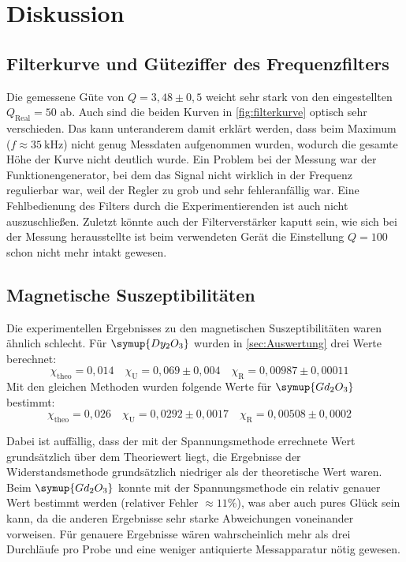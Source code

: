 \section{Diskussion}
\label{sec:Diskussion}

\subsection{Filterkurve und Güteziffer des Frequenzfilters}
\label{sec:Filterkurve und Güteziffer des Frequenzfilters}

Die gemessene Güte von $Q = 3,48 \pm 0,5$ weicht sehr stark von den eingestellten 
$Q_\text{Real} = 50$ ab. Auch sind die beiden Kurven in \autoref{fig:filterkurve} optisch
sehr verschieden. Das kann unteranderem damit erklärt werden, dass beim Maximum ($f
\approx \SI{35}{\kilo\hertz}$) nicht genug Messdaten aufgenommen wurden, wodurch die
gesamte Höhe der Kurve nicht deutlich wurde. Ein Problem bei der Messung war der
Funktionengenerator, bei dem das Signal nicht wirklich in der Frequenz regulierbar war,
weil der Regler zu grob und sehr fehleranfällig war. Eine Fehlbedienung des Filters durch die
Experimentierenden ist auch nicht auszuschließen. Zuletzt könnte auch der Filterverstärker
kaputt sein, wie sich bei der Messung herausstellte ist beim verwendeten Gerät die Einstellung 
$Q = 100$ schon nicht mehr intakt gewesen.

\subsection{Magnetische Suszeptibilitäten}
\label{sec:Magnetische Suszeptibilitäten}

Die experimentellen Ergebnisses zu den magnetischen Suszeptibilitäten waren ähnlich
schlecht. Für $\symup{Dy_2O_3}$ wurden in \autoref{sec:Auswertung} drei Werte berechnet:
\begin{equation}
	\label{eqn:ergebnisse-Dy2O3}
	\chi_\text{theo} = 0,014
	\quad
	\chi_\text{U} = 0,069 \pm 0,004
	\quad
	\chi_\text{R} = 0,00987 \pm 0,00011
	\quad
\end{equation}
Mit den gleichen Methoden wurden folgende Werte für $\symup{Gd_2O_3}$ bestimmt:
\begin{equation}
	\label{eqn:ergebnisse-Gd2O3}
	\chi_\text{theo} = 0,026
	\quad
	\chi_\text{U} = 0,0292 \pm 0,0017
	\quad
	\chi_\text{R} = 0,00508 \pm 0,0002
	\quad
\end{equation}

Dabei ist auffällig, dass der mit der Spannungsmethode errechnete Wert grundsätzlich 
über dem Theoriewert liegt, die Ergebnisse der Widerstandsmethode grundsätzlich niedriger
als der theoretische Wert waren. Beim $\symup{Gd_2O_3}$ konnte mit der Spannungsmethode
ein relativ genauer Wert bestimmt werden (relativer Fehler $\approx 11\%$),
was aber auch pures Glück sein kann, da die anderen Ergebnisse sehr starke
Abweichungen voneinander vorweisen. Für genauere Ergebnisse wären
wahrscheinlich mehr als drei Durchläufe pro Probe und eine weniger antiquierte Messapparatur 
nötig gewesen.

